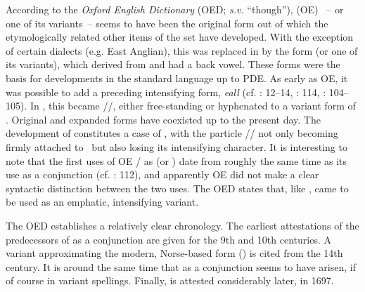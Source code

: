 According to the \textit{Oxford English Dictionary}\nocite{OED} (OED; \textit{s.v.} “though”),  (OE) ~– or one of its variants~– seems to have been the original form out of which the etymologically related other items of the set have developed. With the exception of certain dialects (e.g. East Anglian), this was replaced in  by the form  (or one of its variants), which derived from  and had a back vowel. These forms were the basis for developments in the standard language up to PDE. As early as OE, it was possible to add a preceding intensifying form, \textit{eall} (cf. \citealt{Burnham1911}: 12–14, \citealt{Eitle1914}: 114, \citealt{Chen2000}: 104–105). In , this became //, either free-standing or hyphenated to a variant form of . Original and expanded forms have coexisted up to the present day. The development of  constitutes a case of , with the particle // not only becoming firmly attached to ~but also losing its intensifying character. It is interesting to note that the first uses of OE / as  (or ) date from roughly the same time as its use as a conjunction (cf. \citealt{Eitle1914}: 112), and apparently OE did not make a clear syntactic distinction between the two uses. The OED states that, like ,  came to be used as an emphatic, intensifying variant.

The OED establishes a relatively clear chronology. The earliest attestations of the predecessors of  as a conjunction are given for the 9th and 10th centuries. A variant approximating the modern, Norse-based form () is cited from the 14th century. It is around the same time that  as a conjunction seems to have arisen, if of course in variant spellings. Finally,  is attested considerably later, in 1697.

